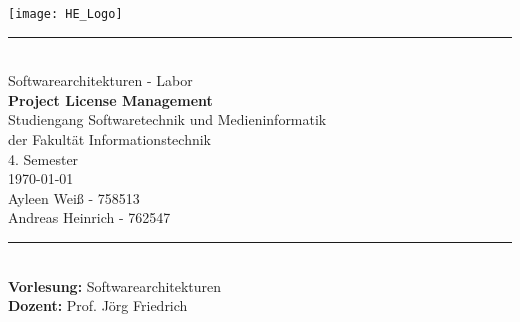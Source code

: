\newcommand{\HRule}[2]{\noindent\rule[#1]{\linewidth}{#2}} %
\newcommand{\vlinespace}[1]{\vspace*{#1\baselineskip}} %
\newcommand{\titleemph}[1]{\textbf{#1}} %
\begin{titlepage}
    \sffamily %
    \hfill \texttt{[image: HE\_Logo]}
    \HRule{13pt}{1pt}
    \centering
    \Large
    \vlinespace{4}\\
    Softwarearchitekturen - Labor\\
    \huge
    \textbf{Project License Management}\\
    \Large
    \vlinespace{3}
    Studiengang Softwaretechnik und Medieninformatik\\
    der Fakultät Informationstechnik\\
    4. Semester\\
    \vlinespace{4}
    \today\\
    \vlinespace{4}
    Ayleen Weiß - 758513\\
    Andreas Heinrich - 762547\\
    \vfill
    \raggedright{}
    \HRule{13pt}{1pt} \\
    \titleemph{Vorlesung:} Softwarearchitekturen\\
    \titleemph{Dozent:} Prof. Jörg Friedrich
\end{titlepage}